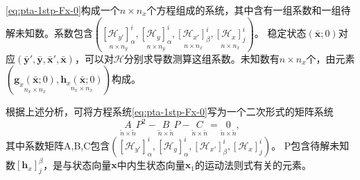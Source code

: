 \eqref{eq:pta-1stp-Fx-0}构成一个$n \times n_x$个方程组成的系统，其中含有一组系数和一组待解未知数。系数包含$\left(\underset{n\times n_y}{\left[ \mathcal{H}_{y'} \right]^{i}_{\alpha}},\underset{n\times n_y}{\left[ \mathcal{H}_{y} \right]^{i}_{\alpha}},\underset{n\times n_x}{\left[ \mathcal{H}_{x'} \right]^{i}_{\beta}},\underset{n\times n_x}{\left[ \mathcal{H}_{x} \right]^{i}_{j}}\right)$。
稳定状态$(\bar{\bm{x}};0)$对应$\left(\bar{\bm{y}}',\bar{\bm{y}},\bar{\bm{x}}',\bar{\bm{x}}\right)$，可以对$\mathcal{H}$分别求导数测算这组系数。未知数有$n \times n_x$个，由元素$\left(\underset{n_x \times n_x}{\bm{g}_x(\bar{\bm{x}};0)}, \underset{n_x \times n_x}{\bm{h}_x(\bar{\bm{x}};0)}\right)$构成。

根据上述分析，可将方程系统\eqref{eq:pta-1stp-Fx-0}写为一个二次形式的矩阵系统
\begin{equation}
  \label{eq:pta-quadratic-matrix-form}
  \underset{\tilde{n} \times \tilde{n}}{A} P^2 - \underset{\tilde{n} \times \tilde{n}}{B} P - \underset{\tilde{n} \times \tilde{n}}{C} = \underset{\tilde{n} \times \tilde{n}}{0},
\end{equation}
其中系数矩阵A,B,C包含$\left({\left[ \mathcal{H}_{y'} \right]^{i}_{\alpha}},{\left[ \mathcal{H}_{y} \right]^{i}_{\alpha}},{\left[ \mathcal{H}_{x'} \right]^{i}_{\beta}},{\left[ \mathcal{H}_{x} \right]^{i}_{j}}\right)$。
P包含待解未知数$\left[ \bm{h}_{x} \right]^{\beta}_{j}$，是与状态向量$\bm{x}$中内生状态向量$\bm{x}_1$的运动法则式有关的元素。


